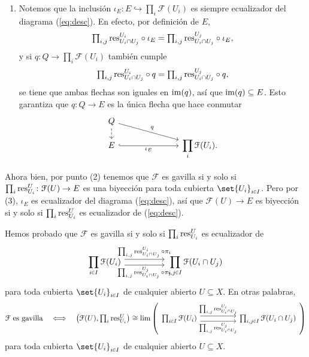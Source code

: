 \begin{sol}
\begin{enumerate}
\item 
Notemos que la inclusión $\iota_E\colon E\hookrightarrow\prod_i\mathcal{F}(U_i)$ es siempre ecualizador del diagrama (\ref{eq:desc}). En efecto, por definición de $E$,
\[\textstyle
\prod_{i,j}{\operatorname{res}^{U_i}_{U_i\cap U_j}}\circ\iota_E
=\prod_{i,j}{\operatorname{res}^{U_j}_{U_i\cap U_j}}\circ\iota_E,
\]
y si $q\colon Q\to\prod_i\mathcal{F}(U_i)$ también cumple
\[\textstyle
\prod_{i,j}{\operatorname{res}^{U_i}_{U_i\cap U_j}}\circ q
=\prod_{i,j}{\operatorname{res}^{U_j}_{U_i\cap U_j}}\circ q,
\]
se tiene que ambas flechas son iguales en $\operatorname{im}(q)$, así que $\operatorname{im}(q)\subseteq E$. Esto garantiza que $q\colon Q\to E$ es la única flecha que hace conmutar
\[
\begin{tikzcd}[column sep=large,row sep=small]
Q \arrow[drr,"q"] \arrow[d,dashed] \\
E \arrow[rr,hook,"\iota_E"'] && \displaystyle\prod_i\mathcal{F}(U_i).
\end{tikzcd}
\]
\end{enumerate}
Ahora bien, por punto (2) tenemos que $\mathcal{F}$ es gavilla si y solo si $\prod_i\operatorname{res}^U_{U_i}\colon\mathcal{F}(U)\to E$ es una biyección para toda cubierta $\set{U_i}_{i\en I}$. Pero por (3), $\iota_E$ es ecualizador del diagrama (\ref{eq:desc}), así que $\mathcal{F}(U)\to E$ es biyección si y solo si $\prod_i\operatorname{res}^U_{U_i}$ es ecualizador de (\ref{eq:desc}).

Hemos probado que $\mathcal{F}$ es gavilla si y solo si $\prod_i\operatorname{res}^U_{U_i}$ es ecualizador de
\[
\begin{tikzcd}[column sep=huge]
\displaystyle\prod_{i\en I}\mathcal{F}(U_i)
\arrow[r,shift left=.8ex,
"{\prod_{i,j}\res^{U_i}_{U_i\cap U_j}\circ\pi_i}"]
\arrow[r,shift right=.8ex,swap,
"{\prod_{i,j}\res^{U_j}_{U_i\cap U_j}\circ\pi_j}"]
& \displaystyle\prod_{i,j\en I}\mathcal{F}(U_i\cap U_j)
\end{tikzcd}
\]
para toda cubierta $\set{U_i}_{i\en I}$ de cualquier abierto $U\subseteq X$. En otras palabras,
\[\textstyle
\mathcal{F}\text{ es gavilla}
\quad\Longleftrightarrow\quad
\left(\mathcal{F}(U),\prod_i\res^U_{U_i}\right)
\cong\lim\left(
\begin{tikzcd}[ampersand replacement=\&,column sep=huge,baseline=-.5ex]
\prod_{i\en I}\mathcal{F}(U_i)
\arrow[r,shift left=.8ex,
"{\prod_{i,j}\res^{U_i}_{U_i\cap U_j}}"]
\arrow[r,shift right=.8ex,swap,
"{\prod_{i,j}\res^{U_j}_{U_i\cap U_j}}"]
\& \prod_{i,j\en I}\mathcal{F}(U_i\cap U_j)
\end{tikzcd}
\right)
\]
para toda cubierta $\set{U_i}_{i\en I}$ de cualquier abierto $U\subseteq X$.
\end{sol}